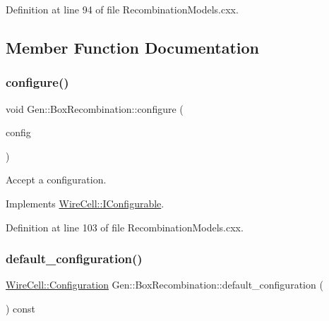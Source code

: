 Definition at line 94 of file Recombination\+Models.\+cxx.



\subsection{Member Function Documentation}
\mbox{\label{class_wire_cell_1_1_gen_1_1_box_recombination_af81aaca6ddde2aecdc3ee3d050611473}} 
\subsubsection{\texorpdfstring{configure()}{configure()}}
{\footnotesize\ttfamily void Gen\+::\+Box\+Recombination\+::configure (\begin{DoxyParamCaption}\item[{const \hyperlink{namespace_wire_cell_a9f705541fc1d46c608b3d32c182333ee}{Wire\+Cell\+::\+Configuration} \&}]{config }\end{DoxyParamCaption})\hspace{0.3cm}{\ttfamily [virtual]}}



Accept a configuration. 



Implements \hyperlink{class_wire_cell_1_1_i_configurable_a57ff687923a724093df3de59c6ff237d}{Wire\+Cell\+::\+I\+Configurable}.



Definition at line 103 of file Recombination\+Models.\+cxx.

\mbox{\label{class_wire_cell_1_1_gen_1_1_box_recombination_ac3ef62f0f3f976f203418e3a1978a846}} 
\subsubsection{\texorpdfstring{default\+\_\+configuration()}{default\_configuration()}}
{\footnotesize\ttfamily \hyperlink{namespace_wire_cell_a9f705541fc1d46c608b3d32c182333ee}{Wire\+Cell\+::\+Configuration} Gen\+::\+Box\+Recombination\+::default\+\_\+configuration (\begin{DoxyParamCaption}{ }\end{DoxyParamCaption}) const\hspace{0.3cm}{\ttfamily [virtual]}}



